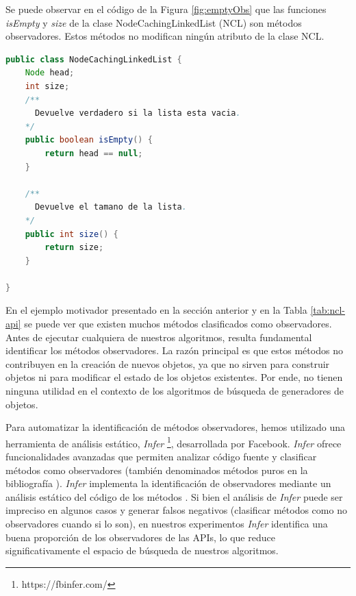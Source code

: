 Se puede observar en el código de la Figura \ref{fig:emptyObs} que las funciones \emph{isEmpty} y \emph{size} de la clase NodeCachingLinkedList (NCL) son métodos observadores.  Estos métodos no modifican ningún atributo de la clase NCL.
 
\begin{lstlisting}[language=Java, label=fig:emptyObs, caption=Algunos métodos observadores de la clase NCL. Se observa que no modifican el estado de NCL., captionpos=b, frame=tb, float=t]
public class NodeCachingLinkedList {
    Node head;
    int size;
    /**
      Devuelve verdadero si la lista esta vacia. 
    */ 
    public boolean isEmpty() { 
        return head == null; 
    }
    
    /**
      Devuelve el tamano de la lista. 
    */ 
    public int size() { 
        return size; 
    }
    
}
\end{lstlisting}


En el ejemplo motivador presentado en la sección anterior y en la Tabla \ref{tab:ncl-api} se puede ver que existen muchos métodos clasificados como observadores. 
Antes de ejecutar cualquiera de nuestros algoritmos, resulta fundamental identificar los métodos observadores. La razón principal es que estos métodos no contribuyen en la creación de nuevos objetos, ya que no sirven para construir objetos ni para modificar el estado de los objetos existentes. Por ende, no tienen ninguna utilidad en el contexto de los algoritmos de búsqueda de generadores de objetos.

Para automatizar la identificación de métodos observadores, hemos utilizado una herramienta de análisis estático, \emph{Infer} \footnote{https://fbinfer.com/}, 
desarrollada por Facebook. \emph{Infer} ofrece funcionalidades avanzadas que permiten analizar código fuente y clasificar métodos como observadores \cite{Huang:2012} (también denominados métodos puros en la bibliografía \cite{Huang:2012}).
\emph{Infer} implementa la identificación de observadores mediante un análisis estático del código de los métodos \cite{Huang:2012,Salcianu:2005}. 
Si bien el análisis de \emph{Infer} puede ser impreciso en algunos casos y generar falsos negativos (clasificar métodos como no observadores cuando si lo son), 
en nuestros experimentos \emph{Infer}  identifica una buena proporción de los observadores de las APIs, lo que reduce significativamente el espacio de búsqueda de nuestros algoritmos.




